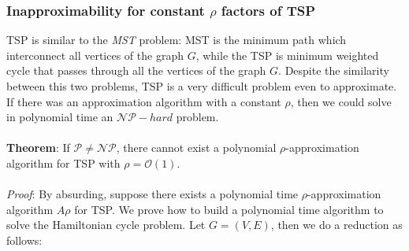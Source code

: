 \subsubsection{Inapproximability for constant $\rho$ factors of TSP}

TSP is similar to the \textit{MST} problem: MST is the minimum path which interconnect all vertices of the graph $G$, while the TSP is minimum weighted cycle that passes through all the vertices of the graph $G$. Despite the similarity between this two problems, TSP is a very difficult problem even to approximate. If there was an approximation algorithm with a constant $\rho$, then we could solve in polynomial time an $\mathcal{NP}-hard$ problem.\\
\\
\noindent
\textbf{Theorem}: If $\mathcal{P} \ne \mathcal{NP}$, there cannot exist a polynomial $\rho$-approximation algorithm for TSP with $\rho = \mathcal{O}(1)$.\\
\\
\noindent
\textit{Proof}: By absurding, suppose there exists a polynomial time $\rho$-approximation algorithm $A\rho$ for TSP. We prove how to build a polynomial time algorithm to solve the Hamiltonian cycle problem. Let $G = (V, E)$, then we do a reduction as follows:

